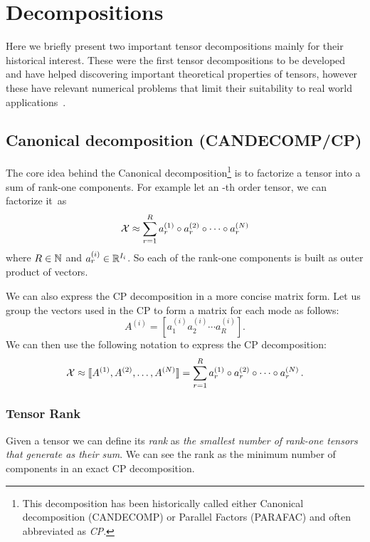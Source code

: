 \chapter{Decompositions}
Here we briefly present two important tensor decompositions mainly for their historical interest. These were the first tensor decompositions to be developed and have helped discovering important theoretical properties of tensors, however these have relevant numerical problems that limit their suitability to real world applications~\cite{tensorreview}.

\section{Canonical decomposition (CANDECOMP/CP)}
The core idea behind the Canonical decomposition\footnote{This decomposition has been historically called either Canonical decomposition (CANDECOMP) or Parallel Factors (PARAFAC) and often abbreviated as \emph{CP}.} is to factorize a tensor into a sum of rank-one components. For example let \X an \N-th order tensor, we can factorize it~as
\begin{equation*}
  \mathcal{X} \approx \sum_{r = 1}^R a_r^{(1)} \circ a_r^{(2)} \circ \cdots \circ a_r^{(N)}
\end{equation*}
where $R \in \mathbb{N}$ and $a_r^{(i)} \in \mathbb{R}^{I_i}$. So each of the rank-one components is built as outer product of \N vectors.

We can also express the CP decomposition in a more concise matrix form.
Let us group the vectors used in the CP to form a matrix for each mode  as follows:
\begin{equation*}
  A^{(i)} = [ a^{(i)}_1 a^{(i)}_2 \cdots a^{(i)}_R ].
\end{equation*}
We can then use the following notation to express the CP decomposition:
\begin{equation*}
  \mathcal{X} \approx \llbracket A^{(1)}, A^{(2)}, \ldots, A^{(N)} \rrbracket = \sum_{r = 1}^R a_r^{(1)} \circ a_r^{(2)} \circ \cdots \circ a_r^{(N)}\, .
\end{equation*}

\subsection{Tensor Rank}
Given a tensor \X we can define its \emph{rank} as \emph{the smallest number of rank-one tensors that generate \X as their sum}. We can see the rank as the minimum number of components in an exact CP decomposition.

